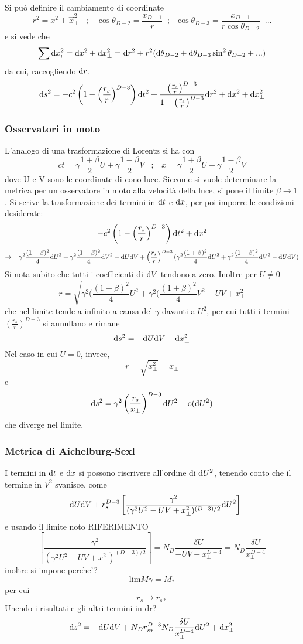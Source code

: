 Si pu\`o definire il cambiamento di coordinate
\[ r^2 = x^2 + \vec{x}^2_\perp \;\;\; ; \;\;\; \cos\theta_{D-2} = \frac{x_{D-1}}{r}  \;\; ; \;\; \cos\theta_{D-3} = \frac{x_{D-1}}{r\cos\theta_{D-2}} \;\; ...\] 
e si vede che 
\[ \sum \mathrm{d} x_i^2 = \mathrm{d} x^2 + \mathrm{d} x^2_\perp = \mathrm{d} r^2 + r^2(\mathrm{d} \theta_{D-2} + \mathrm{d} \theta_{D-3} \sin^2\theta_{D-2} + ... )\]
da cui, raccogliendo $\mathrm{d} r$,
\[  \mathrm{d} s^2 = -c^2 \left( 1- \left(\frac{r_s}{r}\right)^{D-3} \right) \mathrm{d} t^2 
    + \frac{     \left(\frac{r_s}{r}\right)^{D-3} }
           { 1-  \left(\frac{r_s}{r}\right)^{D-3} } \mathrm{d} r^2 
    +  \mathrm{d} x^2 + \mathrm{d} x^2_\perp  \]


\subsubsection{Osservatori in moto}
L'analogo di una trasformazione di Lorentz si ha con
\[ ct = \gamma \frac{1+\beta}{2}U + \gamma \frac{1-\beta}{2}V \;\;\; ; \;\;\; x = \gamma \frac{1+\beta}{2}U - \gamma \frac{1-\beta}{2}V \]
dove U e V sono le coordinate di cono luce. Siccome si vuole determinare la metrica per un osservatore in moto alla velocit\`a della luce,  si pone il limite \( \beta \rightarrow 1 \).
Si scrive la trasformazione dei termini in $\mathrm{d} t$ e $\mathrm{d} x$, per poi imporre le condizioni desiderate:
\[ -c^2 \left( 1- \left(\frac{r_s}{r}\right)^{D-3} \right) \mathrm{d} t^2 +  \mathrm{d} x^2 \] 
\[ \rightarrow \;\;\; \gamma^2 \frac{(1+\beta)^2}{4} \mathrm{d} U^2 + \gamma^2 \frac{(1-\beta)^2}{4} \mathrm{d} V^2 - \mathrm{d} U\mathrm{d} V + \left(\frac{r_s}{r}\right)^{D-3}(\gamma^2 \frac{(1+\beta)^2}{4} \mathrm{d} U^2 + \gamma^2 \frac{(1-\beta)^2}{4} \mathrm{d} V^2 - \mathrm{d} U\mathrm{d} V) \]
Si nota subito che tutti i coefficienti di $\mathrm{d} V$ tendono a zero. Inoltre per \(U\neq 0\)
\[ r = \sqrt{ \gamma^2 (\frac{(1+\beta)^2}{4} U^2 +  \gamma^2 (\frac{(1+\beta)^2}{4} V^2 - UV +   x^2_\perp} \]
che nel limite tende a infinito a causa del $\gamma$ davanti a $U^2$, per cui tutti i termini $\left(\frac{r_s}{r}\right)^{D-3}$ si annullano e rimane
\[ \mathrm{d} s^2 = -\mathrm{d} U\mathrm{d} V + \mathrm{d} x^2_\perp \]
Nel caso in cui \(U=0\), invece, 
\[ r = \sqrt{  x^2_\perp } = x_\perp\]
e 
\[ \mathrm{d} s^2 = \gamma^2  \left(\frac{r_s}{x_\perp}\right)^{D-3} \mathrm{d} U^2 + \mathrm{o}(\mathrm{d} U^2) \]
che diverge nel limite.

\subsubsection{Metrica di Aichelburg-Sexl}
I termini in $\mathrm{d} t$ e $\mathrm{d} x$ si possono riscrivere all'ordine di $\mathrm{d} U^2$, tenendo conto che il termine in $V^2$ svanisce, come
\[ -\mathrm{d} U\mathrm{d} V + r_s^{D-3} \left[ \frac{\gamma^2}{ (\gamma^2 U^2 - UV + x_\perp^2)^{(D-3)/2} } \mathrm{d} U^2 \right] \]
e usando il limite noto \todo RIFERIMENTO 
\[ \left[ \frac{\gamma^2}{ (\gamma^2 U^2 - UV + x_\perp^2)^{(D-3)/2} } \right] =  N_D \frac{\delta{U}}{-UV + x_\perp^{D-4}} =  N_D \frac{\delta{U}}{ x_\perp^{D-4}} \]
inoltre si impone \todo perche'?
\[ \mathrm{lim} M \gamma = M_* \]
per cui 
\[r_s \rightarrow r_{s*} \]
Unendo i risultati \todo e gli altri termini in dr?
\[ \mathrm{d} s^2 = -\mathrm{d} U\mathrm{d} V + N_D r_{s*}^{D-3} N_D \frac{\delta{U}}{ x_\perp^{D-4}} \mathrm{d} U^2 + \mathrm{d} x_\perp^2 \]

